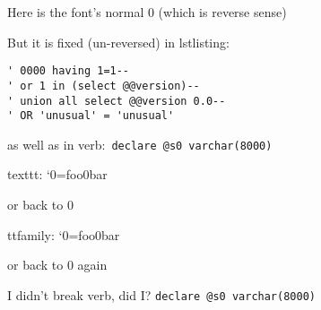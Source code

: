 \documentclass{article}
\newcommand\0{\scalebox{-1}[1]{0}}
\let\svttfamily\ttfamily
\renewcommand\ttfamily{\svttfamily\catcode`0=\active }
\renewcommand\texttt{\bgroup\ttfamily\texttthelp}
\def\texttthelp#1{#1\egroup}
\begin{document}
Here is the font's normal 0 (which is reverse sense)\par
But it is fixed (un-reversed) in lstlisting:
\begin{lstlisting}[framexleftmargin=0mm,
                   basicstyle=\ttfamily\small,
                   breaklines,
                   columns=fullflexible]
' 0000 having 1=1--
' or 1 in (select @@version)--
' union all select @@version 0.0--
' OR 'unusual' = 'unusual'
\end{lstlisting}\par
as well as in verb:~\verb|declare @s0 varchar(8000)|

\noindent\hrulefill

texttt: \texttt{foo0bar}

or back to 0

ttfamily: {\ttfamily foo0bar}

or back to 0 again

\noindent\hrulefill

I didn't break verb, did I? \verb|declare @s0 varchar(8000)|
\end{document}
